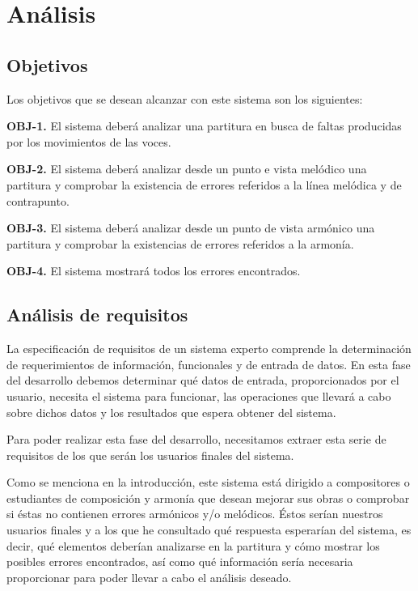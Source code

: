 \chapter{Análisis}

\section{Objetivos}

Los objetivos que se desean alcanzar con este sistema son los siguientes:

\bigskip
\textbf{OBJ-1.} El sistema deberá analizar una partitura en busca de faltas producidas por los movimientos de las voces.

\textbf{OBJ-2.} El sistema deberá analizar desde un punto e vista melódico una partitura y comprobar la existencia de errores referidos a la línea melódica y de contrapunto.

\textbf{OBJ-3.} El sistema deberá analizar desde un punto de vista armónico una partitura y comprobar la existencias de errores referidos a la armonía.

\textbf{OBJ-4.} El sistema mostrará todos los errores encontrados. 

\section{Análisis de requisitos}

La especificación de requisitos de un sistema experto comprende la determinación de requerimientos de información, funcionales y de entrada de datos. En esta fase del desarrollo debemos determinar qué datos de entrada, proporcionados por el usuario, necesita el sistema para funcionar, las operaciones que llevará a cabo sobre dichos datos y los resultados que espera obtener del sistema.  

Para poder realizar esta fase del desarrollo, necesitamos extraer esta serie de requisitos de los que serán los usuarios finales del sistema.

Como se menciona en la introducción, este sistema está dirigido a compositores o estudiantes de composición y armonía que desean mejorar sus obras o comprobar si éstas no contienen errores armónicos y/o melódicos. Éstos serían nuestros usuarios finales y a los que he consultado qué respuesta esperarían del sistema, es decir, qué elementos deberían analizarse en la partitura y cómo mostrar los posibles errores encontrados, así como qué información sería necesaria proporcionar para poder llevar a cabo el análisis deseado. 

